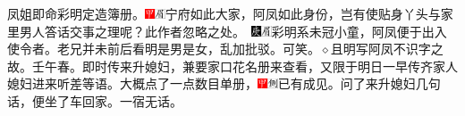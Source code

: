 凤姐即命彩明定造簿册。{{\includegraphics[width=3mm]{../Images/00002}\includegraphics[width=3mm]{../Images/00010}\footnotesize \kaishu 宁府如此大家，阿凤如此身份，岂有使贴身丫头与家里男人答话交事之理呢？此作者忽略之处。　}\includegraphics[width=3mm]{../Images/00004}\includegraphics[width=3mm]{../Images/00010}\footnotesize \kaishu 彩明系未冠小童，阿凤便于出入使令者。老兄并未前后看明是男是女，乱加批驳。可笑。{$\diamond$}{且明写阿凤不识字之故。壬午春。}}即时传来升媳妇，兼要家口花名册来查看，又限于明日一早传齐家人媳妇进来听差等语。大概点了一点数目单册，{\includegraphics[width=3mm]{../Images/00002}\includegraphics[width=3mm]{../Images/00011}\footnotesize \kaishu 已有成见。}问了来升媳妇几句话，便坐了车回家。一宿无话。

